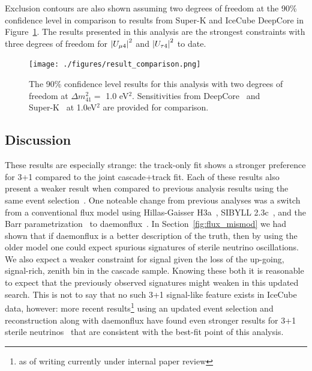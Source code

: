 \documentclass[main.tex]{subfiles}
\begin{document}
Exclusion contours are also shown assuming two degrees of freedom at the 90\% confidence level in comparison to results from Super-K and IceCube DeepCore in Figure~\ref{fig:comparison_results}. 
The results presented in this analysis are the strongest constraints with three degrees of freedom for $\left| U_{\mu 4} \right|^{2}$ and $\left| U_{\tau 4} \right|^{2}$ to date. 


\begin{figure}
    \centering
    \texttt{[image: ./figures/result\_comparison.png]}
    \caption{The 90\% confidence level results for this analysis with two degrees of freedom at $\Delta m_{41}^{2}=$ 1.0 eV$^{2}$. Sensitivities from DeepCore~\cite{Aartsen_2017_dc} and Super-K~\cite{PhysRevD.91.052019} at 1.0eV$^{2}$ are provided for comparison.}\label{fig:comparison_results}
\end{figure}    

\subsection{Discussion}

These results are especially strange: the track-only fit shows a stronger preference for 3+1 compared to the joint cascade+track fit. 
Each of these results also present a weaker result when compared to previous analysis results using the same event selection~\cite{Aartsen_2020, Aartsen_2020_prd}.
One noteable change from previous analyses was a switch from a conventional flux model using Hillas-Gaisser H3a~\cite{GAISSER2012801}, SIBYLL 2.3c~\cite{Riehn:2017mfm}, and the Barr parametrization~\cite{PhysRevD.74.094009} to daemonflux~\cite{yanez2023daemonflux}.
In Section~\ref{fig:flux_mismod} we had shown that if daemonflux is a better description of the truth, then by using the older model one could expect spurious signatures of sterile neutrino oscillations. 
We also expect a weaker constraint for signal given the loss of the up-going, signal-rich, zenith bin in the cascade sample. 
Knowing these both it is reasonable to expect that the previously observed signatures might weaken in this updated search. 
This is not to say that no such 3+1 signal-like feature exists in IceCube data, however: more recent results\footnote{as of writing currently under internal paper review} using an updated event selection and reconstruction along with daemonflux have found even stronger results for 3+1 sterile neutrinos~\cite{alfonso_slides} that are consistent with the best-fit point of this analysis.
\end{document}
